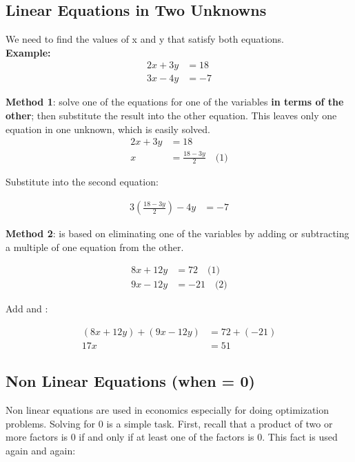 \documentclass{article}
\begin{document}
\subsection{Linear Equations in Two Unknowns}
We need to find the values of x and y that satisfy both equations. \\

\textbf{Example:}
\begin{align*}
2x + 3y &= 18 \\
3x - 4y &= -7
\end{align*}

\textbf{Method 1}: solve one of the equations for one of the variables \textbf{in terms of the other}; then substitute the result into the other equation. This leaves only one equation in one unknown, which is easily solved.
\begin{align*}
2x + 3y &= 18 \\
x &= \frac{18 - 3y}{2} \quad \text{(1)}
\end{align*}

Substitute  into the second equation:

\begin{align*}
3\left(\frac{18 - 3y}{2}\right) - 4y &= -7
\end{align*}

\textbf{Method 2}: is based on eliminating one of the variables by adding or subtracting a multiple of one equation from the other.

\begin{align*}
8x + 12y &= 72 \quad \text{(1)} \\
9x - 12y &= -21 \quad \text{(2)}
\end{align*}

Add  and :

\begin{align*}
(8x + 12y) + (9x - 12y) &= 72 + (-21) \\
17x &= 51
\end{align*}

\subsection{Non Linear Equations (when = 0)}

Non linear equations are used in economics especially for doing optimization problems. Solving for 0 is a simple task. First, recall that a product of two or more factors is 0 if and only if at least one of the factors is 0. This fact is used again and again:
\end{document}
